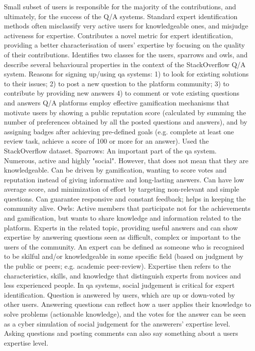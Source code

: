Small subset of users is responsible for the majority of the contributions, and ultimately, for the success of the Q/A systems. Standard expert identification methods often misclassify very active users for knowledgeable ones, and misjudge activeness for expertise.
Contributes a novel metric for expert identification, providing a better characterisation of users' expertise by focusing on the quality of their contributions. Identifies two classes for the users, sparrows and owls, and describe several behavioural properties in the context of the StackOverflow Q/A system.
Reasons for signing up/using qa systems:
1)	to look for existing solutions to their issues;
2)	to post a new question to the platform community;
3)	to contribute by providing new answers
4)	to comment or vote existing questions and answers
Q/A platforms employ effective gamification mechanisms that motivate users by showing a public reputation score (calculated by summing the number of preferences obtained by all the posted questions and answers), and by assigning badges after achieving pre-defined goals (e.g. complete at least one review task, achieve a score of 100 or more for an answer). Used the StackOverflow dataset.
Sparrows:
An important part of the qa system. Numerous, active and highly "social". However, that does not mean that they are knowledgeable. Can be driven by gamification, wanting to score votes and reputation instead of giving informative and long-lasting answers. Can have low average score, and minimization of effort by targeting non-relevant and simple questions. Can guarantee responsive and  constant feedback; helps in keeping the community alive.
Owls:
Active members that participate not for the achievements and gamification, but wants to share knowledge and information related to the platform. Experts in the related topic, providing useful answers and can show expertise by answering questions seen as difficult, complex or important to the users of the community.
An expert can be defined as someone who is recognised to be skilful and/or knowledgeable in some specific field (based on judgment by the public or peers; e.g. academic peer-review). Expertise then refers to the characteristics, skills, and knowledge that distinguish experts from novices and less experienced people.
In qa systems, social judgement is critical for expert identification. Question is answered by users, which are up or down-voted by other users. Answering questions can reflect how a user applies their knowledge to solve problems (actionable knowledge), and the votes for the answer can be seen as a cyber simulation of social judgement for the answerers' expertise level. Asking questions and posting comments can also say something about a users expertise level. 
